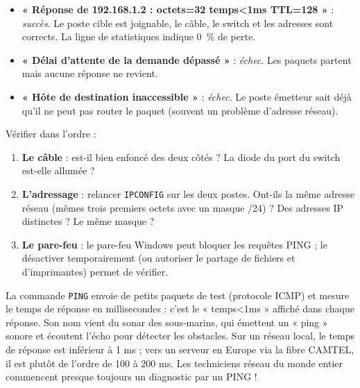 \documentclass[11pt]{article}
\newcommand{\cle}[1]{{\popxbold\color{popdark}#1}}
\begin{document}
\begin{propriete}
\begin{itemize}
\item \textbf{« Réponse de 192.168.1.2 : octets=32 temps<1ms TTL=128 »} : \emph{succès}. Le poste cible est joignable, le câble, le switch et les adresses sont corrects. La ligne de statistiques indique 0~\% de perte.
\item \textbf{« Délai d'attente de la demande dépassé »} : \emph{échec}. Les paquets partent mais aucune réponse ne revient.
\item \textbf{« Hôte de destination inaccessible »} : \emph{échec}. Le poste émetteur sait déjà qu'il ne peut pas router le paquet (souvent un problème d'adresse réseau).
\end{itemize}
\end{propriete}

\begin{methode}
Vérifier dans l'ordre :
\begin{enumerate}
\item \textbf{Le câble} : est-il bien enfoncé des deux côtés ? La diode du port du switch est-elle allumée ?
\item \textbf{L'adressage} : relancer \texttt{IPCONFIG} sur les deux postes. Ont-ils la même adresse réseau (mêmes trois premiers octets avec un masque /24) ? Des adresses IP distinctes ? Le même masque ?
\item \textbf{Le pare-feu} : le pare-feu Windows peut bloquer les requêtes PING ; le désactiver temporairement (ou autoriser le partage de fichiers et d'imprimantes) permet de vérifier.
\end{enumerate}
\end{methode}

\begin{savaistu}
La commande \texttt{PING} envoie de petits paquets de test (protocole ICMP) et mesure le \cle{temps de réponse} en millisecondes : c'est le « temps<1ms » affiché dans chaque réponse. Son nom vient du sonar des sous-marins, qui émettent un « ping » sonore et écoutent l'écho pour détecter les obstacles. Sur un réseau local, le temps de réponse est inférieur à 1 ms ; vers un serveur en Europe via la fibre CAMTEL, il est plutôt de l'ordre de 100 à 200 ms. Les techniciens réseau du monde entier commencent presque toujours un diagnostic par un PING !
\end{savaistu}
\end{document}

